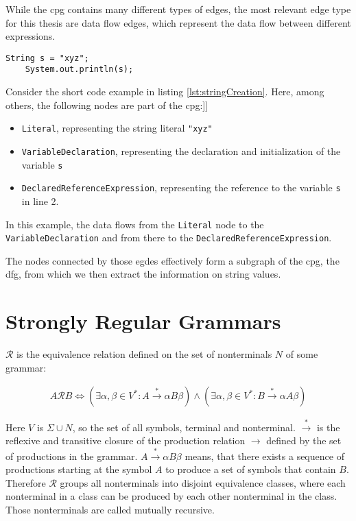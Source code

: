 While the \ac{cpg} contains many different types of edges, the most relevant edge type for this thesis are data flow edges, which represent the data flow between different expressions.

\begin{lstlisting}[label={lst:stringCreation}, caption={Example code}, captionpos=b]
	String s = "xyz";
	System.out.println(s);
\end{lstlisting}

Consider the short code example in listing \ref{lst:stringCreation}. Here, among others, the following nodes are part of the \ac{cpg}:]]

\begin{itemize}
	\item \lstinline|Literal|, representing the string literal \lstinline{"xyz"}
	\item \lstinline|VariableDeclaration|, representing the declaration and initialization of the variable \lstinline|s|
	\item \lstinline|DeclaredReferenceExpression|, representing the reference to the variable \lstinline|s| in line 2.
\end{itemize}

In this example, the data flows from the \lstinline|Literal| node to the \lstinline|VariableDeclaration| and from there to the \lstinline|DeclaredReferenceExpression|.

The nodes connected by those egdes effectively form a subgraph of the \ac{cpg}, the \ac{dfg}, from which we then extract the information on string values.


\section{Strongly Regular Grammars}\label{sec:background:srg}

$\mathcal{R}$ is the equivalence relation defined on the set of nonterminals $N$ of some grammar:

\begin{align}
	A \mathcal{R} B \Leftrightarrow (\exists \alpha, \beta \in V^* : A \xrightarrow{*} \alpha B \beta) \land (\exists \alpha, \beta \in V^* : B \xrightarrow{*} \alpha A \beta) 
\end{align}

Here $V$ is $\Sigma \cup N$, so the set of all symbols, terminal and nonterminal. $\xrightarrow{*}$ is the reflexive and transitive closure of the production relation $\rightarrow$ defined by the set of productions in the grammar. $A \xrightarrow{*} \alpha B \beta$ means, that there exists a sequence of productions starting at the symbol $A$ to produce a set of symbols that contain $B$. Therefore $\mathcal{R}$ groups all nonterminals into disjoint equivalence classes, where each nonterminal in a class can be produced by each other nonterminal in the class. Those nonterminals are called mutually recursive.

